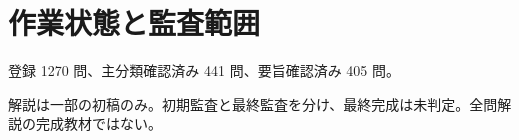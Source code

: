 \chapter{作業状態と監査範囲}
登録 1270 問、主分類確認済み 441 問、要旨確認済み 405 問。
\par 解説は一部の初稿のみ。初期監査と最終監査を分け、最終完成は未判定。全問解説の完成教材ではない。
